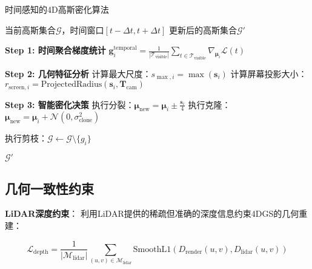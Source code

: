 \begin{algorithm}
\caption{时间感知的4D高斯密化算法}
\label{alg:temporal_aware_densification}
\begin{algorithmic}[1]
\REQUIRE 当前高斯集合$\mathcal{G}$，时间窗口$[t-\Delta t, t+\Delta t]$
\ENSURE 更新后的高斯集合$\mathcal{G}'$

\STATE \textbf{Step 1: 时间聚合梯度统计}
    \STATE $\mathbf{g}_i^{\text{temporal}} = \frac{1}{|\mathcal{T}_{\text{visible}}|} \sum_{t \in \mathcal{T}_{\text{visible}}} \nabla_{\boldsymbol{\mu}_i} \mathcal{L}(t)$
\ENDFOR

\STATE \textbf{Step 2: 几何特征分析}
    \STATE 计算最大尺度：$s_{\max,i} = \max(\mathbf{s}_i)$
    \STATE 计算屏幕投影大小：$r_{\text{screen},i} = \text{ProjectedRadius}(\mathbf{s}_i, \mathbf{T}_{\text{cam}})$
\ENDFOR

\STATE \textbf{Step 3: 智能密化决策}
            \STATE 执行分裂：$\boldsymbol{\mu}_{\text{new}} = \boldsymbol{\mu}_i \pm \frac{\mathbf{s}_i}{4}$
        \ELSE
            \STATE 执行克隆：$\boldsymbol{\mu}_{\text{new}} = \boldsymbol{\mu}_i + \mathcal{N}(0, \sigma_{\text{clone}}^2)$
        \ENDIF
    \ENDIF
    
        \STATE 执行剪枝：$\mathcal{G} \leftarrow \mathcal{G} \setminus \{g_i\}$
    \ENDIF
\ENDFOR

\RETURN $\mathcal{G}'$
\end{algorithmic}
\end{algorithm}

\subsection{几何一致性约束}

\textbf{LiDAR深度约束}：
利用LiDAR提供的稀疏但准确的深度信息约束4DGS的几何重建：

\begin{equation}
\mathcal{L}_{\text{depth}} = \frac{1}{|\mathcal{M}_{\text{lidar}}|} \sum_{(u,v) \in \mathcal{M}_{\text{lidar}}} \text{SmoothL1}(D_{\text{render}}(u,v), D_{\text{lidar}}(u,v))
\label{eq:lidar_depth_constraint}
\end{equation}

